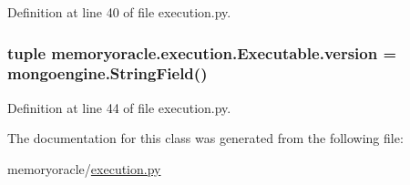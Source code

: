Definition at line 40 of file execution.\+py.

\hypertarget{classmemoryoracle_1_1execution_1_1Executable_a7ef44544b8c9b148bf066357bfa37f92}{}
\subsubsection[{version}]{\setlength{\rightskip}{0pt plus 5cm}tuple memoryoracle.\+execution.\+Executable.\+version = mongoengine.\+String\+Field()\hspace{0.3cm}{\ttfamily [static]}}\label{classmemoryoracle_1_1execution_1_1Executable_a7ef44544b8c9b148bf066357bfa37f92}


Definition at line 44 of file execution.\+py.



The documentation for this class was generated from the following file\+:\begin{DoxyCompactItemize}
\item 
memoryoracle/\hyperlink{execution_8py}{execution.\+py}\end{DoxyCompactItemize}
